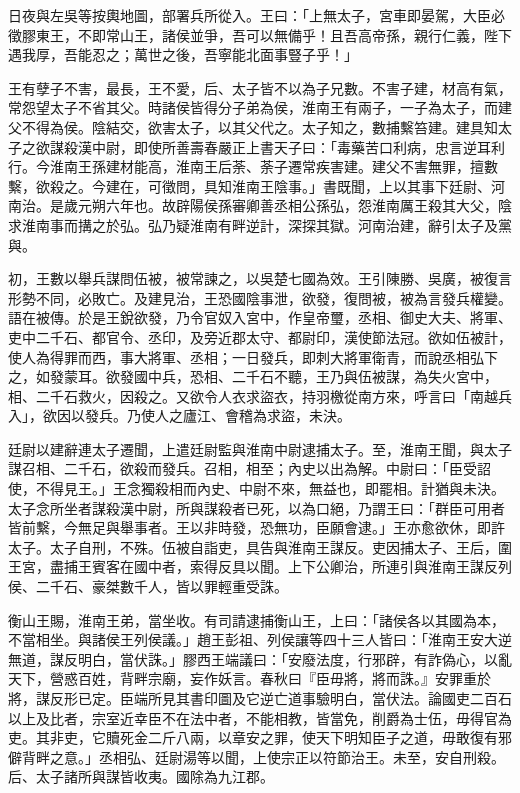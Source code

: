 \begin{pinyinscope}
日夜與左吳等按輿地圖，部署兵所從入。王曰：「上無太子，宮車即晏駕，大臣必徵膠東王，不即常山王，諸侯並爭，吾可以無備乎！且吾高帝孫，親行仁義，陛下遇我厚，吾能忍之；萬世之後，吾寧能北面事豎子乎！」

王有孽子不害，最長，王不愛，后、太子皆不以為子兄數。不害子建，材高有氣，常怨望太子不省其父。時諸侯皆得分子弟為侯，淮南王有兩子，一子為太子，而建父不得為侯。陰結交，欲害太子，以其父代之。太子知之，數捕繫笞建。建具知太子之欲謀殺漢中尉，即使所善壽春嚴正上書天子曰：「毒藥苦口利病，忠言逆耳利行。今淮南王孫建材能高，淮南王后荼、荼子遷常疾害建。建父不害無罪，擅數繫，欲殺之。今建在，可徵問，具知淮南王陰事。」書既聞，上以其事下廷尉、河南治。是歲元朔六年也。故辟陽侯孫審卿善丞相公孫弘，怨淮南厲王殺其大父，陰求淮南事而搆之於弘。弘乃疑淮南有畔逆計，深探其獄。河南治建，辭引太子及黨與。

初，王數以舉兵謀問伍被，被常諫之，以吳楚七國為效。王引陳勝、吳廣，被復言形勢不同，必敗亡。及建見治，王恐國陰事泄，欲發，復問被，被為言發兵權變。語在被傳。於是王銳欲發，乃令官奴入宮中，作皇帝璽，丞相、御史大夫、將軍、吏中二千石、都官令、丞印，及旁近郡太守、都尉印，漢使節法冠。欲如伍被計，使人為得罪而西，事大將軍、丞相；一日發兵，即刺大將軍衛青，而說丞相弘下之，如發蒙耳。欲發國中兵，恐相、二千石不聽，王乃與伍被謀，為失火宮中，相、二千石救火，因殺之。又欲令人衣求盜衣，持羽檄從南方來，呼言曰「南越兵入」，欲因以發兵。乃使人之廬江、會稽為求盜，未決。

廷尉以建辭連太子遷聞，上遣廷尉監與淮南中尉逮捕太子。至，淮南王聞，與太子謀召相、二千石，欲殺而發兵。召相，相至；內史以出為解。中尉曰：「臣受詔使，不得見王。」王念獨殺相而內史、中尉不來，無益也，即罷相。計猶與未決。太子念所坐者謀殺漢中尉，所與謀殺者已死，以為口絕，乃謂王曰：「群臣可用者皆前繫，今無足與舉事者。王以非時發，恐無功，臣願會逮。」王亦愈欲休，即許太子。太子自刑，不殊。伍被自詣吏，具告與淮南王謀反。吏因捕太子、王后，圍王宮，盡捕王賓客在國中者，索得反具以聞。上下公卿治，所連引與淮南王謀反列侯、二千石、豪桀數千人，皆以罪輕重受誅。

衡山王賜，淮南王弟，當坐收。有司請逮捕衡山王，上曰：「諸侯各以其國為本，不當相坐。與諸侯王列侯議。」趙王彭祖、列侯讓等四十三人皆曰：「淮南王安大逆無道，謀反明白，當伏誅。」膠西王端議曰：「安廢法度，行邪辟，有詐偽心，以亂天下，營惑百姓，背畔宗廟，妄作妖言。春秋曰『臣毋將，將而誅。』安罪重於將，謀反形已定。臣端所見其書印圖及它逆亡道事驗明白，當伏法。論國吏二百石以上及比者，宗室近幸臣不在法中者，不能相教，皆當免，削爵為士伍，毋得官為吏。其非吏，它贖死金二斤八兩，以章安之罪，使天下明知臣子之道，毋敢復有邪僻背畔之意。」丞相弘、廷尉湯等以聞，上使宗正以符節治王。未至，安自刑殺。后、太子諸所與謀皆收夷。國除為九江郡。


\end{pinyinscope}
